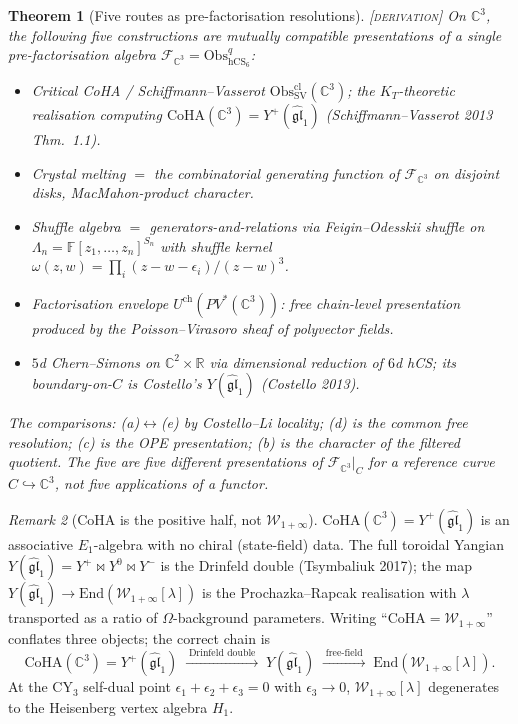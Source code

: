 \documentclass[11pt]{amsart}
\providecommand{\C}{\mathbb{C}}
\providecommand{\R}{\mathbb{R}}
\providecommand{\gghone}{\widehat{\mathfrak{gl}}_1}
\providecommand{\cF}{\mathcal{F}}
\providecommand{\CoHA}{\mathrm{CoHA}}
\providecommand{\Winf}{\mathcal{W}_{1+\infty}}
\providecommand{\Obs}{\mathrm{Obs}}
\providecommand{\End}{\mathrm{End}}
\providecommand{\Yp}{Y^{+}}
\providecommand{\Ynull}{Y}
\providecommand{\hCS}{\mathrm{hCS}}
\providecommand{\Eone}{E_1}
\providecommand{\ClaimStatusDerivation}{\textsc{[derivation]}}
\theoremstyle{plain}
\newtheorem{theorem}{Theorem}[section]
\theoremstyle{definition}
\theoremstyle{remark}
\newtheorem{remark}[theorem]{Remark}
\begin{document}
\begin{theorem}[Five routes as pre-factorisation resolutions]
\label{thm:five-routes}
\ClaimStatusDerivation{}\;
On $\C^3$, the following five constructions are mutually compatible
presentations of a single pre-factorisation algebra
$\cF_{\C^3}=\Obs^{q}_{\hCS_6}$:
\begin{itemize}[leftmargin=2em]
\item[\textup{(a)}] \emph{Critical CoHA / Schiffmann--Vasserot}
$\Obs^{\mathrm{cl}}_{\mathrm{SV}}(\C^3)$; the $K_T$-theoretic realisation
computing $\CoHA(\C^3)=\Yp(\gghone)$ (Schiffmann--Vasserot 2013
Thm.~1.1).
\item[\textup{(b)}] \emph{Crystal melting} $=$ the combinatorial
generating function of $\cF_{\C^3}$ on disjoint disks, MacMahon-product
character.
\item[\textup{(c)}] \emph{Shuffle algebra} $=$ generators-and-relations
via Feigin--Odesskii shuffle on
$\Lambda_n=\mathbb{F}[z_1,\ldots,z_n]^{S_n}$ with shuffle kernel
$\omega(z,w)=\prod_i(z-w-\epsilon_i)/(z-w)^3$.
\item[\textup{(d)}] \emph{Factorisation envelope}
$U^{\mathrm{ch}}(PV^\ast(\C^3))$: free chain-level presentation
produced by the Poisson--Virasoro sheaf of polyvector fields.
\item[\textup{(e)}] \emph{$5$d Chern--Simons} on $\C^2\times\R$ via
dimensional reduction of $6$d hCS; its boundary-on-$C$ is Costello's
$\Ynull(\gghone)$ (Costello 2013).
\end{itemize}
The comparisons: (a)$\leftrightarrow$(e) by Costello--Li locality;
(d) is the common free resolution; (c) is the OPE presentation; (b) is
the character of the filtered quotient. The five are five different
presentations of $\cF_{\C^3}|_C$ for a reference curve
$C\hookrightarrow\C^3$, not five applications of a functor.
\end{theorem}

\begin{remark}[CoHA is the positive half, not $\Winf$]
\label{rem:coha-not-winfty}
$\CoHA(\C^3)=\Yp(\gghone)$ is an associative $\Eone$-algebra with no
chiral (state-field) data. The full toroidal Yangian
$\Ynull(\gghone)=\Yp\bowtie Y^0\bowtie Y^{-}$ is the Drinfeld double
(Tsymbaliuk 2017); the map $\Ynull(\gghone)\to\End(\Winf[\lambda])$ is
the Prochazka--Rapcak realisation with $\lambda$ transported as a ratio
of $\Omega$-background parameters. Writing ``$\CoHA=\Winf$'' conflates
three objects; the correct chain is
\[
\CoHA(\C^3)=\Yp(\gghone)\;\xrightarrow{\;\text{Drinfeld double}\;}\;
\Ynull(\gghone)\;\xrightarrow{\;\text{free-field}\;}\;
\End(\Winf[\lambda]).
\]
At the CY$_3$ self-dual point $\epsilon_1+\epsilon_2+\epsilon_3=0$
with $\epsilon_3\to 0$, $\Winf[\lambda]$ degenerates to the
Heisenberg vertex algebra $H_1$.
\end{remark}
\end{document}
